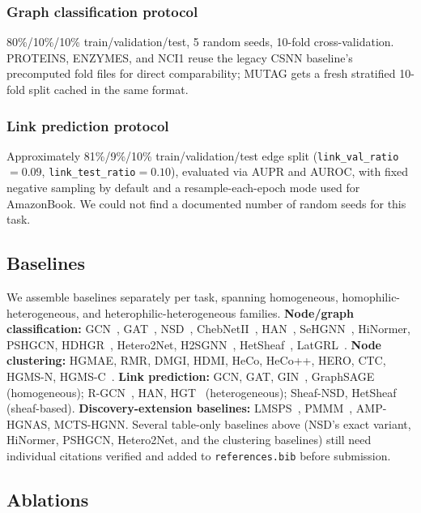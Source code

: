 \documentclass{article}
\begin{document}
\subsubsection{Graph classification protocol}
80\%/10\%/10\% train/validation/test, 5 random seeds, 10-fold cross-validation. PROTEINS, ENZYMES,
and NCI1 reuse the legacy CSNN baseline's precomputed fold files for direct comparability; MUTAG
gets a fresh stratified 10-fold split cached in the same format.

\subsubsection{Link prediction protocol}
Approximately 81\%/9\%/10\% train/validation/test edge split (\texttt{link\_val\_ratio}$=0.09$,
\texttt{link\_test\_ratio}$=0.10$), evaluated via AUPR and AUROC, with fixed negative sampling by
default and a resample-each-epoch mode used for AmazonBook. We could not find a documented number
of random seeds for this task.

\subsection{Baselines}

We assemble baselines separately per task, spanning homogeneous, homophilic-heterogeneous, and
heterophilic-heterogeneous families. \textbf{Node/graph classification:} GCN~\citep{kipf2017gcn},
GAT~\citep{velickovic2018gat}, NSD~\citep{bodnar2022neural}, ChebNetII~\citep{he2022chebnetii},
HAN~\citep{wang2019han}, SeHGNN~\citep{yang2023sehgnn}, HiNormer, PSHGCN, HDHGR~\citep{guo2023hdhgr},
Hetero2Net, H2SGNN~\citep{lu2024h2sgnn}, HetSheaf~\citep{braithwaite2024hetsheaf},
LatGRL~\citep{shen2024latgrl}. \textbf{Node clustering:} HGMAE, RMR, DMGI, HDMI, HeCo, HeCo++, HERO,
CTC, HGMS-N, HGMS-C~\citep{wang2025hgms}. \textbf{Link prediction:} GCN, GAT,
GIN~\citep{xu2019gin}, GraphSAGE~\citep{hamilton2017sage} (homogeneous);
R-GCN~\citep{schlichtkrull2018rgcn}, HAN, HGT~\citep{hu2020hgt} (heterogeneous); Sheaf-NSD,
HetSheaf (sheaf-based). \textbf{Discovery-extension baselines:} LMSPS~\citep{yan2024lmsps},
PMMM~\citep{jiang2022pmmm}, AMP-HGNAS, MCTS-HGNN. Several table-only baselines above (NSD's exact
variant, HiNormer, PSHGCN, Hetero2Net, and the clustering baselines) still need individual
citations verified and added to \texttt{references.bib} before submission.

\subsection{Ablations}
\label{sec:ablations}
\end{document}
